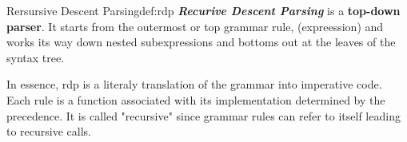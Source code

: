 \documentclass[12pt,a4paper]{article}
\newcommand{\newpar} {
  \vspace{1em}
  \noindent
}
\newcommand{\bemph}[1]{\textbf{\emph{#1}}}
\begin{document}
\begin{definition}{Rersursive Descent Parsing}{def:rdp}\label{rdp}
	\bemph{Recurive  Descent Parsing} is a \textbf{top-down parser}.
	It starts from the outermost or top grammar rule, (expreession) and works its way down
	nested subexpressions and bottoms out at the leaves of the syntax tree.
\end{definition}

\newpar
In essence, rdp is a literaly translation of the grammar into imperative code.
Each rule is a function associated with its implementation determined by the precedence.
It is called "recursive" since grammar rules can refer to itself leading to recursive calls.
\end{document}
